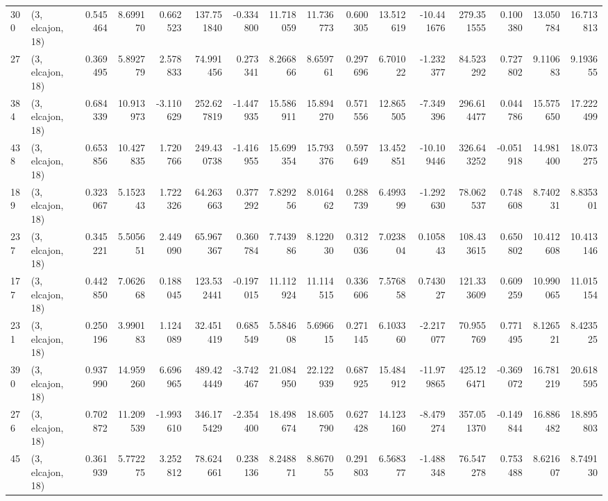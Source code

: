 \begin{tabular}{llrrrrrrrrrrrrrr}
300 &  (3, elcajon, 18) &   0.545464 &   8.699170 &   0.662523 &   137.751840 &  -0.334800 &  11.718059 &  11.736773 &  0.600305 &  13.512619 & -10.441676 &    279.351555 &    0.100380 &   13.050784 &   16.713813 \\
27  &  (3, elcajon, 18) &   0.369495 &   5.892779 &   2.578833 &    74.991456 &   0.273341 &   8.266866 &   8.659761 &  0.297696 &   6.701022 &  -1.232377 &     84.523292 &    0.727802 &    9.110683 &    9.193655 \\
384 &  (3, elcajon, 18) &   0.684339 &  10.913973 &  -3.110629 &   252.627819 &  -1.447935 &  15.586911 &  15.894270 &  0.571556 &  12.865505 &  -7.349396 &    296.614477 &    0.044786 &   15.575650 &   17.222499 \\
438 &  (3, elcajon, 18) &   0.653856 &  10.427835 &   1.720766 &   249.430738 &  -1.416955 &  15.699354 &  15.793376 &  0.597649 &  13.452851 & -10.109446 &    326.643252 &   -0.051918 &   14.981400 &   18.073275 \\
189 &  (3, elcajon, 18) &   0.323067 &   5.152343 &   1.722326 &    64.263663 &   0.377292 &   7.829256 &   8.016462 &  0.288739 &   6.499399 &  -1.292630 &     78.062537 &    0.748608 &    8.740231 &    8.835301 \\
237 &  (3, elcajon, 18) &   0.345221 &   5.505651 &   2.449090 &    65.967367 &   0.360784 &   7.743986 &   8.122030 &  0.312036 &   7.023804 &   0.105843 &    108.433615 &    0.650802 &   10.412608 &   10.413146 \\
177 &  (3, elcajon, 18) &   0.442850 &   7.062668 &   0.188045 &   123.532441 &  -0.197015 &  11.112924 &  11.114515 &  0.336606 &   7.576858 &   0.743027 &    121.333609 &    0.609259 &   10.990065 &   11.015154 \\
231 &  (3, elcajon, 18) &   0.250196 &   3.990183 &   1.124089 &    32.451419 &   0.685549 &   5.584608 &   5.696615 &  0.271145 &   6.103360 &  -2.217077 &     70.955769 &    0.771495 &    8.126521 &    8.423525 \\
390 &  (3, elcajon, 18) &   0.937990 &  14.959260 &   6.696965 &   489.424449 &  -3.742467 &  21.084950 &  22.122939 &  0.687925 &  15.484912 & -11.979865 &    425.126471 &   -0.369072 &   16.781219 &   20.618595 \\
276 &  (3, elcajon, 18) &   0.702872 &  11.209539 &  -1.993610 &   346.175429 &  -2.354400 &  18.498674 &  18.605790 &  0.627428 &  14.123160 &  -8.479274 &    357.051370 &   -0.149844 &   16.886482 &   18.895803 \\
45  &  (3, elcajon, 18) &   0.361939 &   5.772275 &   3.252812 &    78.624661 &   0.238136 &   8.248871 &   8.867055 &  0.291803 &   6.568377 &  -1.488348 &     76.547278 &    0.753488 &    8.621607 &    8.749130 \\

\end{tabular}
